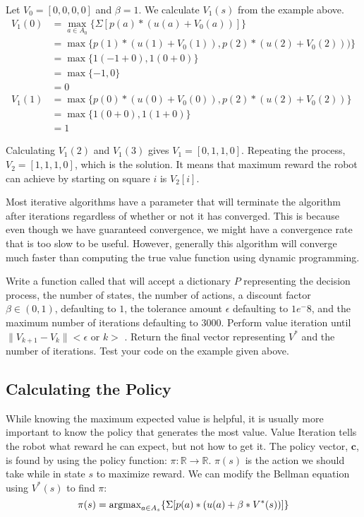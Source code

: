 Let $V_0 = [0,0,0,0]$ and $\beta = 1$.
We calculate $V_1(s)$ from the example above.
\begin{align*}
V_1(0) &= \max_{a \in A_0} \{\Sigma[p(a)*(u(a)+V_0(a))]\} \\
&= \max \{p(1)*(u(1)+V_0(1)), p(2)*(u(2)+V_0(2)))\} \\
&= \max \{1(-1+0), 1(0+0)\} \\
&= \max \{-1,0\} \\
&= 0\\
V_1(1) &= \max \{p(0)*(u(0)+V_0(0)), p(2)*(u(2)+V_0(2))\}\\
&=\max \{1(0+0), 1(1+0)\} \\
&= 1
\end{align*}

Calculating $V_1(2)$ and $V_1(3)$ gives $V_1 = [0, 1, 1, 0]$.
Repeating the process, $V_2 = [1, 1, 1, 0]$, which is the solution.
It means that maximum reward the robot can achieve by starting on square $i$ is $V_2[i]$.

Most iterative algorithms have a  parameter that will terminate the algorithm after  iterations regardless of whether or not it has converged.
This is because even though we have guaranteed convergence, we might have a convergence rate that is too slow to be useful.
However, generally this algorithm will converge much faster than computing the true value function using dynamic programming.

\begin{problem}
\label{prob:policyiter-value1}
Write a function called  that will accept a dictionary $P$ representing the decision process, the number of states, the number of actions, a discount factor $\beta \in (0,1)$, defaulting to $1$,
the tolerance amount $\epsilon$ defaulting to $1e^-8$, and the maximum number of iterations  defaulting to $3000$.
Perform value iteration until $\|V_{k+1} - V_{k}\| < \epsilon$ or $k > $ .
Return the final vector representing $V^*$ and the number of iterations.
Test your code on the example given above.
\end{problem}

\subsection*{Calculating the Policy}

While knowing the maximum expected value is helpful, it is usually more important to know the policy that generates the most value.
Value Iteration tells the robot what reward he can expect, but not how to get it.
The policy vector, $\mathbf{c}$, is found by using the policy function: $\pi : \mathbb{R} \to \mathbb{R}$.
$\pi(s)$ is the action we should take while in state $s$ to maximize reward.
We can modify the Bellman equation using $V^*(s)$ to find $\pi$:
\begin{equation}
\label{eq:policyiter-pol_func}
\pi(s) = \mbox{argmax}_{a \in A_s} \{\Sigma [p(a)*(u(a) + \beta*V^*(s))]\}
\end{equation}

